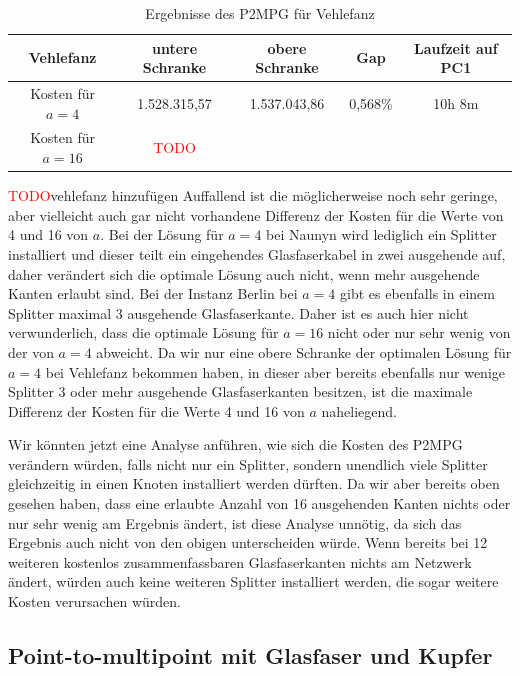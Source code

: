 \documentclass[11pt,a4paper]{article}
\newcommand{\TODO}{\textcolor{red}{TODO}}
\theoremstyle{my_th_style1}
\begin{document}
 \begin{table}[h]
 	\centering
 	\begin{tabular}{c|c|c|c|c}
 		Vehlefanz & untere Schranke & obere Schranke & Gap & Laufzeit auf PC1\\	
 		\hline
 		 Kosten für $a=4$ & 1.528.315,57 & 1.537.043,86 & 0,568\% & 10h 8m\\
 		 \hline
 		Kosten für $a=16$ & \TODO &  & &  \\
 	\end{tabular}
 	\caption{Ergebnisse des P2MPG f\"ur Vehlefanz}
 	\label{P2MPG_Tabelle_V}
 \end{table}
 
\TODO vehlefanz hinzufügen Auffallend ist die m\"oglicherweise noch sehr geringe, aber vielleicht auch gar nicht vorhandene Differenz der Kosten f\"ur die Werte von 4 und 16 von \(a\).
Bei der L\"osung f\"ur \(a=4\) bei Naunyn wird lediglich ein Splitter installiert und dieser teilt ein eingehendes Glasfaserkabel in zwei ausgehende auf, daher ver\"andert sich die optimale L\"osung auch nicht, wenn mehr ausgehende Kanten erlaubt sind.
Bei der Instanz Berlin bei \(a=4\) gibt es ebenfalls in einem Splitter maximal 3 ausgehende Glasfaserkante.
Daher ist es auch hier nicht verwunderlich, dass die optimale L\"osung f\"ur \(a=16\) nicht oder nur sehr wenig von der von \(a=4\) abweicht.
Da wir nur eine obere Schranke der optimalen L\"osung f\"ur \(a=4\) bei Vehlefanz bekommen haben, in dieser aber bereits ebenfalls nur wenige Splitter 3 oder mehr ausgehende Glasfaserkanten besitzen, ist die maximale Differenz der Kosten f\"ur die Werte 4 und 16 von \(a\) naheliegend.

Wir k\"onnten jetzt eine Analyse anf\"uhren, wie sich die Kosten des P2MPG ver\"andern w\"urden, falls nicht nur ein Splitter, sondern unendlich viele Splitter gleichzeitig in einen Knoten installiert werden d\"urften.
Da wir aber bereits oben gesehen haben, dass eine erlaubte Anzahl von 16 ausgehenden Kanten nichts oder nur sehr wenig am Ergebnis \"andert, ist diese Analyse unn\"otig, da sich das Ergebnis auch nicht von den obigen unterscheiden w\"urde.
Wenn bereits bei 12 weiteren kostenlos zusammenfassbaren Glasfaserkanten nichts am Netzwerk \"andert, w\"urden auch keine weiteren Splitter installiert werden, die sogar weitere Kosten verursachen w\"urden.
 
\subsection{Point-to-multipoint mit Glasfaser und Kupfer}
\end{document}
